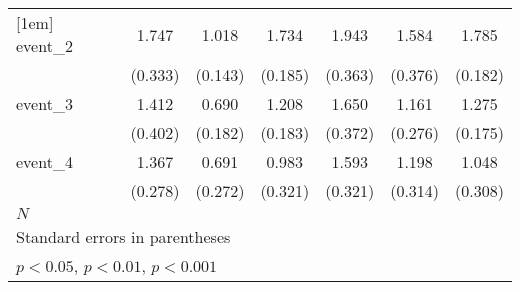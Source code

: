 {\begin{tabular}{l*{6}{c}}
[1em]
event\_2     &       1.747\sym{***}&       1.018\sym{***}&       1.734\sym{***}&       1.943\sym{***}&       1.584\sym{***}&       1.785\sym{***}\\
            &     (0.333)         &     (0.143)         &     (0.185)         &     (0.363)         &     (0.376)         &     (0.182)         \\
[1em]
event\_3     &       1.412\sym{***}&       0.690\sym{***}&       1.208\sym{***}&       1.650\sym{***}&       1.161\sym{***}&       1.275\sym{***}\\
            &     (0.402)         &     (0.182)         &     (0.183)         &     (0.372)         &     (0.276)         &     (0.175)         \\
[1em]
event\_4     &       1.367\sym{***}&       0.691\sym{*}  &       0.983\sym{**} &       1.593\sym{***}&       1.198\sym{***}&       1.048\sym{***}\\
            &     (0.278)         &     (0.272)         &     (0.321)         &     (0.321)         &     (0.314)         &     (0.308)         \\
\hline
\(N\)       &                     &                     &                     &                     &                     &                     \\
\hline\hline
\multicolumn{7}{l}{\footnotesize Standard errors in parentheses}\\
\multicolumn{7}{l}{\footnotesize \sym{*} \(p<0.05\), \sym{**} \(p<0.01\), \sym{***} \(p<0.001\)}\\
\end{tabular}
}
